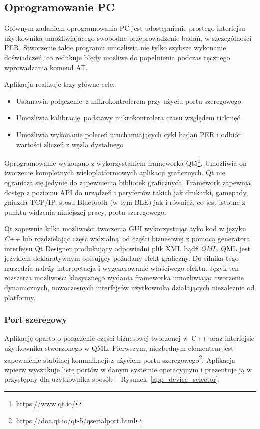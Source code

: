\subsection{Oprogramowanie PC} \label{prep:pc-software}

Głównym zadaniem oprogramowania PC jest udostępnienie prostego interfejsu
użytkownika umożliwiającego swobodne przeprowadzenie badań, w szczególności PER. 
Stworzenie takie programu umożliwia nie tylko szybsze wykonanie doświadczeń, co
redukuje błędy możliwe do popełnienia podczas ręcznego wprowadzania komend AT.

Aplikacja realizuje trzy główne cele: 
\begin{itemize}
\item Ustanawia połączenie z mikrokontrolerem przy użyciu portu szeregowego
\item Umożliwia kalibrację podstawy mikrokontrolera czasu względem ticknięć 
\item Umożliwia wykonanie poleceń uruchamiających cykl badań PER i odbiór wartości
zliczeń z węzła dystalnego
\end{itemize}

Oprogramowanie wykonano z wykorzystaniem frameworka Qt5\footnote{\url{https://www.qt.io/}}.
Umożliwia on tworzenie kompletnych wieloplatformowych aplikacji graficznych. Qt nie
ogranicza się jedynie do zapewnienia bibliotek graficznych. Framework zapewnia
dostęp z poziomu \gls{API} do urządzeń i peryferiów takich jak drukarki,
gamepady, gniazda TCP/IP, stosu Bluetooth (w tym BLE) jak i również,
co jest istotne z punktu widzenia niniejszej pracy, portu szeregowego.

Qt zapewnia kilka możliwości tworzenia GUI wykorzystując tyko kod w języku \textit{C++}
lub rozdzielając część widzialną od części biznesowej z pomocą generatora interfejsu
Qt Designer produkujący odpowiedni plik \gls{XML} bądź \textit{QML}. QML jest językiem
deklaratywnym opisujący pożądany efekt graficzny. Do silnika tego narzędzia należy
interpretacja i wygenerowanie właściwego efektu. Język ten rozszerza możliwości
klasycznego wydania frameworka umożliwiając tworzenie dynamicznych, nowoczesnych 
interfejsów użytkownika działających niezależnie od platformy.

\subsubsection{Port szeregowy}
Aplikację oparto o połączenie części biznesowej tworzonej w~C++ oraz interfejsie
użytkownika stworzonego w QML. Pierwszym, niezbędnym elementem jest zapewnienie
stabilnej komunikacji z użyciem portu szeregowego\footnote{\url{https://doc.qt.io/qt-5/qserialport.html}}.
Aplikacja wpierw wyszukuje listę portów w danym systemie operacyjnym i prezentuje ją
w przystępny dla użytkownika sposób -- Rysunek~\ref{app_device_selector}.

